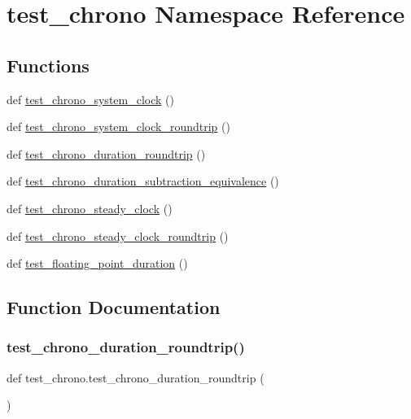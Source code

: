\hypertarget{namespacetest__chrono}{}\section{test\+\_\+chrono Namespace Reference}
\label{namespacetest__chrono}
\subsection*{Functions}
\begin{DoxyCompactItemize}
\item 
def \mbox{\hyperlink{namespacetest__chrono_a1075cbba603e02357a32612c25ee0fda}{test\+\_\+chrono\+\_\+system\+\_\+clock}} ()
\item 
def \mbox{\hyperlink{namespacetest__chrono_a221036dad4fb44f37d02562589a862d2}{test\+\_\+chrono\+\_\+system\+\_\+clock\+\_\+roundtrip}} ()
\item 
def \mbox{\hyperlink{namespacetest__chrono_acd075efc2d82868ce5cc452eeecf1498}{test\+\_\+chrono\+\_\+duration\+\_\+roundtrip}} ()
\item 
def \mbox{\hyperlink{namespacetest__chrono_a352d3e8efdc3f182ed62ae549a55451e}{test\+\_\+chrono\+\_\+duration\+\_\+subtraction\+\_\+equivalence}} ()
\item 
def \mbox{\hyperlink{namespacetest__chrono_a0bb78e49e5723c4111fbfb05bc69762a}{test\+\_\+chrono\+\_\+steady\+\_\+clock}} ()
\item 
def \mbox{\hyperlink{namespacetest__chrono_a3f759f9c945690bb4d26ac098213b27c}{test\+\_\+chrono\+\_\+steady\+\_\+clock\+\_\+roundtrip}} ()
\item 
def \mbox{\hyperlink{namespacetest__chrono_a8a9002edcffb967600f7fdb9e5d92cc3}{test\+\_\+floating\+\_\+point\+\_\+duration}} ()
\end{DoxyCompactItemize}


\subsection{Function Documentation}
\mbox{\label{namespacetest__chrono_acd075efc2d82868ce5cc452eeecf1498}} 
\subsubsection{\texorpdfstring{test\_chrono\_duration\_roundtrip()}{test\_chrono\_duration\_roundtrip()}}
{\footnotesize\ttfamily def test\+\_\+chrono.\+test\+\_\+chrono\+\_\+duration\+\_\+roundtrip (\begin{DoxyParamCaption}{ }\end{DoxyParamCaption})}

